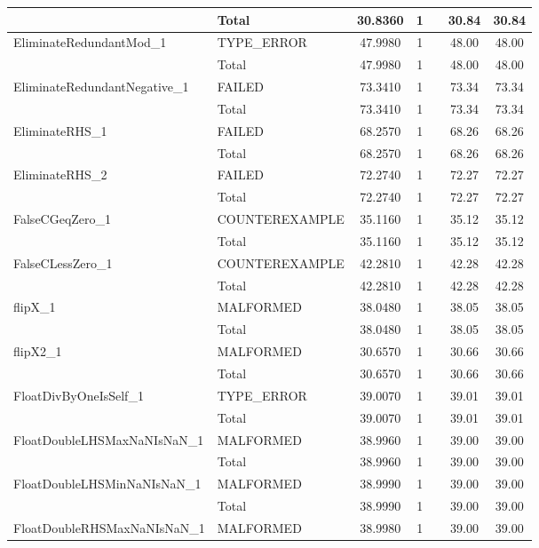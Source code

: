 \begin{appendices}
\begin{longtable}{L{0.25\textwidth} L{0.2\textwidth}  c  c  c  c  c }
    & Total & 30.8360 & 1 &  & 30.84 & 30.84 \\ \midrule 
    EliminateRedundantMod\_1 & TYPE\_ERROR & 47.9980 & 1 &  & 48.00 & 48.00 \\ \midrule 
    & Total & 47.9980 & 1 &  & 48.00 & 48.00 \\ \midrule 
    EliminateRedundantNegative\_1 & FAILED & 73.3410 & 1 &  & 73.34 & 73.34 \\ \midrule 
    & Total & 73.3410 & 1 &  & 73.34 & 73.34 \\ \midrule 
    EliminateRHS\_1 & FAILED & 68.2570 & 1 &  & 68.26 & 68.26 \\ \midrule 
    & Total & 68.2570 & 1 &  & 68.26 & 68.26 \\ \midrule 
    EliminateRHS\_2 & FAILED & 72.2740 & 1 &  & 72.27 & 72.27 \\ \midrule 
    & Total & 72.2740 & 1 &  & 72.27 & 72.27 \\ \midrule 
    FalseCGeqZero\_1 & COUNTEREXAMPLE & 35.1160 & 1 &  & 35.12 & 35.12 \\ \midrule 
    & Total & 35.1160 & 1 &  & 35.12 & 35.12 \\ \midrule 
    FalseCLessZero\_1 & COUNTEREXAMPLE & 42.2810 & 1 &  & 42.28 & 42.28 \\ \midrule 
    & Total & 42.2810 & 1 &  & 42.28 & 42.28 \\ \midrule 
    flipX\_1 & MALFORMED & 38.0480 & 1 &  & 38.05 & 38.05 \\ \midrule 
    & Total & 38.0480 & 1 &  & 38.05 & 38.05 \\ \midrule 
    flipX2\_1 & MALFORMED & 30.6570 & 1 &  & 30.66 & 30.66 \\ \midrule 
    & Total & 30.6570 & 1 &  & 30.66 & 30.66 \\ \midrule 
    FloatDivByOneIsSelf\_1 & TYPE\_ERROR & 39.0070 & 1 &  & 39.01 & 39.01 \\ \midrule 
    & Total & 39.0070 & 1 &  & 39.01 & 39.01 \\ \midrule 
    FloatDoubleLHSMaxNaNIsNaN\_1 & MALFORMED & 38.9960 & 1 &  & 39.00 & 39.00 \\ \midrule 
    & Total & 38.9960 & 1 &  & 39.00 & 39.00 \\ \midrule 
    FloatDoubleLHSMinNaNIsNaN\_1 & MALFORMED & 38.9990 & 1 &  & 39.00 & 39.00 \\ \midrule 
    & Total & 38.9990 & 1 &  & 39.00 & 39.00 \\ \midrule 
    FloatDoubleRHSMaxNaNIsNaN\_1 & MALFORMED & 38.9980 & 1 &  & 39.00 & 39.00 \\ \midrule 

\end{longtable}
\end{appendices}
